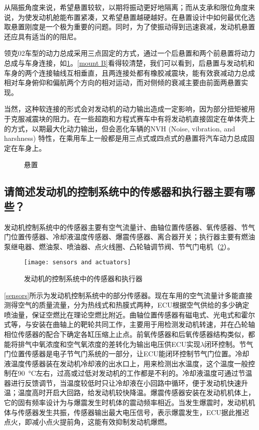 \documentclass[UTF8]{ctexart}
\numberwithin{figure}{section}
\numberwithin{table}{section}
\begin{document}
从隔振角度来说，希望悬置较软，以期将振动更好地隔离；而从支承和限位角度来说，为使发动机舱能布置紧凑，又希望悬置越硬越好。在悬置设计中如何最优化选取悬置刚度是一个极为重要的问题。同时，为了使振动得到迅速衰减，发动机悬置还应具有适当的的阻尼。

领克02车型的动力总成采用三点固定的方式，通过一个后悬置和两个前悬置将动力总成与车身连接，如\cref{mount}。\cref{mount B}看得较清楚，我们可以看到，后悬置与发动机和车身的两个连接轴线互相垂直，且两连接处都有橡胶减震块，能有效衰减动力总成相对车身俯仰和偏航两个方向的相对运动，而对侧倾的衰减主要由前面两悬置实现。

当然，这种软连接的形式会对发动机的动力输出造成一定影响，因为部分扭矩被用于克服减震块的阻力。在一些超跑和方程式赛车中有将发动机直接固定在单体壳上的方式，以期最大化动力输出，但会恶化车辆的NVH (Noise, vibration, and harshness) 特性，在乘用车上一般都是用三点式或四点式的悬置将汽车动力总成固定在车身上。

\begin{figure}[htbp]
	\centering
	\caption{悬置}
	\label{mount}
\end{figure}

\subsection{请简述发动机的控制系统中的传感器和执行器主要有哪些？}

发动机控制系统中的传感器主要有空气流量计、曲轴位置传感器、氧传感器、节气门位置传感器、冷却液温度传感器、爆震传感器、离合器开关；执行器主要有燃油泵继电器、燃油泵、喷油器、点火线圈、凸轮轴调节阀、节气门电机（\cref{sensors and actuators}）。

\begin{figure}[htbp]
	\centering
	\texttt{[image: sensors and actuators]}
	\caption{发动机的控制系统中的传感器和执行器}
	\label{sensors and actuators}
\end{figure}

\cref{sensors}所示为发动机控制系统中的部分传感器。现在车用的空气流量计多能直接测得空气的质量流量，分为热线式和热膜式两种，ECU根据空气供给的多少确定喷油量，保证空燃比在理论空燃比附近。曲轴位置传感器有磁电式、光电式和霍尔式等，与安装在曲轴上的靶轮共同工作，主要用于用检测发动机转速，并在凸轮轴相位传感器的配合下确定各缸压缩上止点。前氧传感器和后氧传感器结构类似，都能将排气中氧浓度和空气氧浓度的差转化为输出电压供ECU实现$\lambda$闭环控制。节气门位置传感器是电子节气门系统的一部分，让ECU能闭环控制节气门位置。冷却液温度传感器装在发动机冷却液的出水口上，用来检测出水温度，这个温度一般控制在\SI{90}{\celsius}左右，过高或过低对发动机的工作都是不利的。冷却液温度可通过节温器进行反馈调节，当温度较低时只让冷却液在小回路中循环，便于发动机快速升温；温度高时开启大回路，给发动机较快降温。爆震传感器安装在发动机机体上，它的固有频率设计为与爆震发生时机体的震动频率相近。当发生爆震时，发动机机体与传感器发生共振，传感器输出最大电压信号，表示爆震发生，ECU据此推迟点火，即减小点火提前角，这能有效抑制发动机爆燃。
\end{document}
